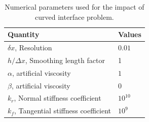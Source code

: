 \begin{table}[!ht]
  \centering
  \begin{tabular}[!ht]{ll}
    \toprule
    Quantity & Values\\
    \midrule
    $\delta x $, Resolution & $0.01$\\
    $h/\Delta x$, Smoothing length factor & 1\\
    $\alpha$, artificial viscosity & $1$ \\
    $\beta$, artificial viscosity & $0$ \\
    $k_r$, Normal stiffness coefficient & $10^{10}$ \\
    $k_f$, Tangential stiffness coefficient & $10^{9}$ \\
    \bottomrule
  \end{tabular}
  \caption{Numerical parameters used for the impact of curved interface problem.}%
  \label{tab:curved-interface-numerical-params}
\end{table}


